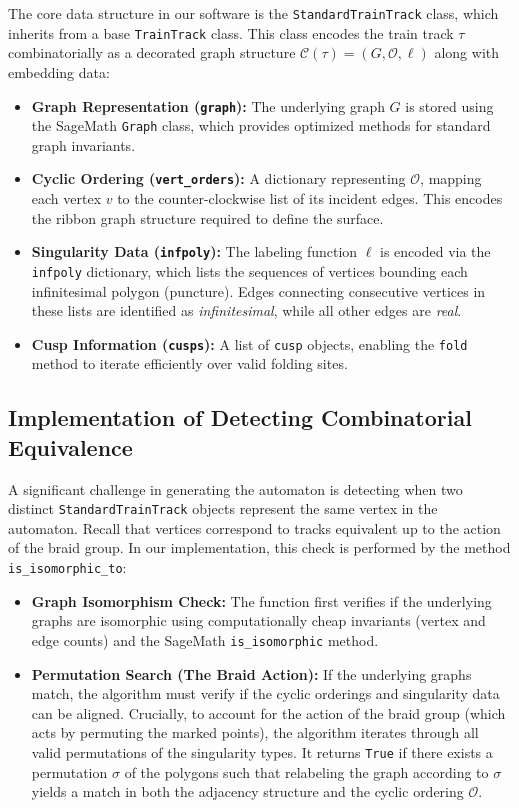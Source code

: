 The core data structure in our software is the \texttt{StandardTrainTrack} class, which inherits from a base \texttt{TrainTrack} class. This class encodes the train track $\tau$ combinatorially as a decorated graph structure $\mathcal{C}(\tau) = (G, \mathcal{O}, \ell)$ along with embedding data:
\begin{itemize}
    \item \textbf{Graph Representation (\texttt{graph}):} The underlying graph $G$ is stored using the SageMath \texttt{Graph} class, which provides optimized methods for standard graph invariants.
    \item \textbf{Cyclic Ordering (\texttt{vert\_orders}):} A dictionary representing $\mathcal{O}$, mapping each vertex $v$ to the counter-clockwise list of its incident edges. This encodes the ribbon graph structure required to define the surface.
    \item \textbf{Singularity Data (\texttt{infpoly}):} The labeling function $\ell$ is encoded via the \texttt{infpoly} dictionary, which lists the sequences of vertices bounding each infinitesimal polygon (puncture). Edges connecting consecutive vertices in these lists are identified as \textit{infinitesimal}, while all other edges are \textit{real}.
    \item \textbf{Cusp Information (\texttt{cusps}):} A list of \texttt{cusp} objects, enabling the \texttt{fold} method to iterate efficiently over valid folding sites.
\end{itemize}

\subsection{Implementation of Detecting Combinatorial Equivalence}
A significant challenge in generating the automaton is detecting when two distinct \texttt{StandardTrainTrack} objects represent the same vertex in the automaton. Recall that vertices correspond to tracks equivalent up to the action of the braid group. In our implementation, this check is performed by the method \texttt{is\_isomorphic\_to}:

\begin{itemize}
    \item \textbf{Graph Isomorphism Check:} The function first verifies if the underlying graphs are isomorphic using computationally cheap invariants (vertex and edge counts) and the SageMath \texttt{is\_isomorphic} method.
    \item \textbf{Permutation Search (The Braid Action):} If the underlying graphs match, the algorithm must verify if the cyclic orderings and singularity data can be aligned. Crucially, to account for the action of the braid group (which acts by permuting the marked points), the algorithm iterates through all valid permutations of the singularity types. It returns \texttt{True} if there exists a permutation $\sigma$ of the polygons such that relabeling the graph according to $\sigma$ yields a match in both the adjacency structure and the cyclic ordering $\mathcal{O}$.
\end{itemize}

